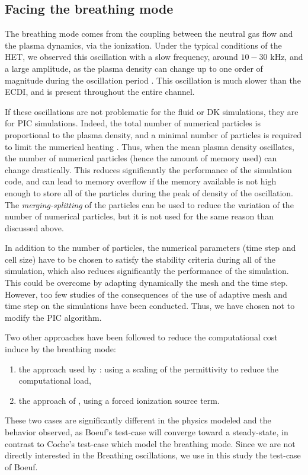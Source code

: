 \subsection{Facing the breathing mode} \label{subsec-breathmod}
The breathing mode comes from the coupling between the neutral gas flow and the plasma dynamics, via the ionization.
Under the typical conditions of the \ac{HET}, we observed this oscillation with a slow frequency, around  $10-30$ kHz, and a large amplitude, as the plasma density can change up to one order of magnitude during the oscillation period \citep{barral2003a,barral2009}.
This oscillation is much slower than the \ac{ECDI}, and is present throughout the entire channel.

If these oscillations are not problematic for the fluid or \ac{DK} simulations, they are for \ac{PIC} simulations.
Indeed, the total number of numerical particles is proportional to the plasma density, and a minimal number of particles is required to limit the numerical heating \citep{turner2006}.
Thus, when the mean plasma density oscillates, the number of numerical particles (hence the amount of memory used) can change drastically.
This reduces significantly the performance of the simulation code, and can lead to memory overflow if the memory available is not high enough to store all of the particles during the peak of density  of the oscillation.
The \emph{merging-splitting} of the particles  can be used to reduce the variation of the number of numerical particles, but it is not used for the same reason than discussed above.

In addition to the number of particles, the numerical parameters (time step and cell size) have to be chosen to satisfy the stability criteria during all of the simulation, which also reduces significantly the performance of the simulation. 
This could be overcome by adapting dynamically the mesh and the time step.
However, too few studies of the consequences of the use of adaptive mesh and time step on the simulations have been conducted.
Thus, we have chosen not to modify the \ac{PIC} algorithm.

Two other approaches have been followed to reduce the computational cost induce by the breathing mode\string:
\begin{enumerate}
  \item the approach used by \citet{coche2014}\string: using a scaling of the permittivity to reduce the computational load,
  \item the approach of \citet{boeuf2017}, using a forced ionization source term.
\end{enumerate} 
These two cases are significantly different in the physics modeled and the behavior observed, as Boeuf's test-case will converge toward a steady-state, in contrast to Coche's test-case which model the breathing mode.
Since we are not directly interested in the Breathing oscillations, we use in this study the test-case of Boeuf.

